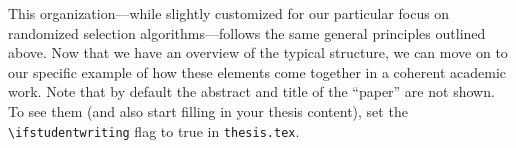 This organization—while slightly customized for our particular focus on randomized selection algorithms—follows the same general principles outlined above. Now that we have an overview of the typical structure, we can move on to our specific example of how these elements come together in a coherent academic work. Note that by default the abstract and title of the ``paper'' are not shown.
To see them (and also start filling in your thesis content), set the \lstinline|\ifstudentwriting| flag to true in \lstinline|thesis.tex|.
